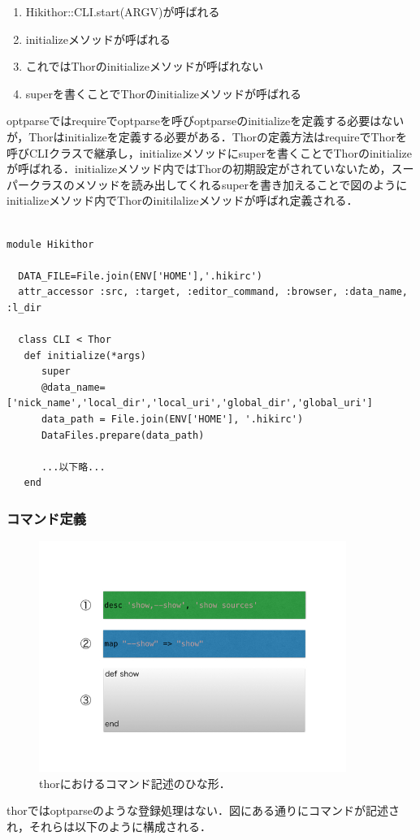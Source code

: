 \begin{enumerate}
\item Hikithor::CLI.start(ARGV)が呼ばれる
\item initializeメソッドが呼ばれる
\item これではThorのinitializeメソッドが呼ばれない
\item superを書くことでThorのinitializeメソッドが呼ばれる
\end{enumerate}
optparseではrequireでoptparseを呼びoptparseのinitializeを定義する必要はないが，Thorはinitializeを定義する必要がある．Thorの定義方法はrequireでThorを呼びCLIクラスで継承し，initializeメソッドにsuperを書くことでThorのinitializeが呼ばれる．initializeメソッド内ではThorの初期設定がされていないため，スーパークラスのメソッドを読み出してくれるsuperを書き加えることで図のようにinitializeメソッド内でThorのinitilalizeメソッドが呼ばれ定義される．
\begin{lstlisting}[style=customRuby,basicstyle={\scriptsize\ttfamily}]

module Hikithor

  DATA_FILE=File.join(ENV['HOME'],'.hikirc')
  attr_accessor :src, :target, :editor_command, :browser, :data_name, :l_dir

  class CLI < Thor
   def initialize(*args)
      super
      @data_name=['nick_name','local_dir','local_uri','global_dir','global_uri']
      data_path = File.join(ENV['HOME'], '.hikirc')
      DataFiles.prepare(data_path)

      ...以下略...
   end
\end{lstlisting}
\subsubsection{コマンド定義}
\begin{figure}[htbp]\begin{center}
\includegraphics[width=10cm,bb= 0 0 737 553]{../figs/./hikiutils_yamane.004.jpg}
\caption{thorにおけるコマンド記述のひな形．}
\label{default}\end{center}\end{figure}
thorではoptparseのような登録処理はない．図にある通りにコマンドが記述され，それらは以下のように構成される．

